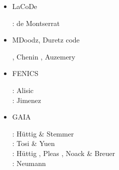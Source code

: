\begin{itemize}
\cite{maierova}
\cite{mals14}

\item {\codefont LaCoDe}  

\begin{scriptsize}
\noindent
\twothousandnineteen: de Montserrat \etal \cite{demh19}
\end{scriptsize}

\item {\codefont MDoodz}, Duretz code

\begin{scriptsize}
\cite{yatd12}
\cite{yahb13}
\cite{yadm15}
\cite{dumy16}\cite{dupm16}
\cite{chmd19}\cite{dual19}\cite{pedm19}
\cite{poyd20}\cite{bedh20}, Chenin \etal \cite{chsm20}, Auzemery \etal \cite{auwy20}
\end{scriptsize}

\item {\codefont FENICS} 

\begin{scriptsize}
\noindent
\twothousandfourteen: Alisic \etal \cite{alrk14}\\
\twothousandseventeen: Jimenez \etal \cite{jidb17}
\end{scriptsize}


\item {\codefont GAIA} 

\begin{scriptsize}
\noindent
\twothousandeight: H{\"u}ttig \& Stemmer \cite{hust08b} \\
\twothousandeleven: Tosi \& Yuen \cite{toyu11} \\
\twothousandthirteen: H{\"u}ttig \etal \cite{hutm13}, Pleas \etal \cite{plth13}, Noack \& Breuer \cite{nobr13} \\
\twothousandnineteen: Neumann \cite{neum19}
\end{scriptsize}


\end{itemize}

